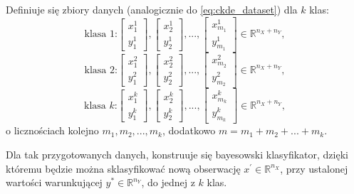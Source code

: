 \documentclass[12pt,a4paper,oneside]{book}
\theoremstyle{definition}
\begin{document}
Definiuje się zbiory danych (analogicznie do \eqref{eq:ckde_dataset}) dla $k$ klas:
\begin{equation}\label{eq:classification_dataset1}
\text{klasa 1:}
\begin{bmatrix}
x_1^1 \\
y_1^1
\end{bmatrix},
\begin{bmatrix}
x_2^1 \\
y_2^1
\end{bmatrix},
...,
\begin{bmatrix}
x_{m_1}^1 \\
y_{m_1}^1
\end{bmatrix} \in \mathbb{R}^{n_X+n_Y},
\end{equation}
\begin{equation}\label{eq:classification_dataset2}
\text{klasa 2:}
\begin{bmatrix}
x_1^2 \\
y_1^2
\end{bmatrix},
\begin{bmatrix}
x_2^2 \\
y_2^2
\end{bmatrix},
...,
\begin{bmatrix}
x_{m_2}^2 \\
y_{m_2}^2
\end{bmatrix} \in \mathbb{R}^{n_X+n_Y},
\end{equation}
\begin{equation}\label{eq:classification_datasetk}
\text{klasa $k$:}
\begin{bmatrix}
x_1^k \\
y_1^k
\end{bmatrix},
\begin{bmatrix}
x_2^k \\
y_2^k
\end{bmatrix},
...,
\begin{bmatrix}
x_{m_k}^k \\
y_{m_k}^k
\end{bmatrix} \in \mathbb{R}^{n_X+n_Y},
\end{equation}
o licznościach kolejno $m_1, m_2, ...,m_k$, dodatkowo $m=m_1+m_2+ ...+m_k$.

Dla tak przygotowanych danych, konstruuje się bayesowski klasyfikator, dzięki któremu będzie można sklasyfikować nową obserwację $x^\prime \in \mathbb{R}^{n_X}$, przy ustalonej wartości warunkującej $y^* \in \mathbb{R}^{n_Y}$, do jednej z $k$ klas.
\end{document}
